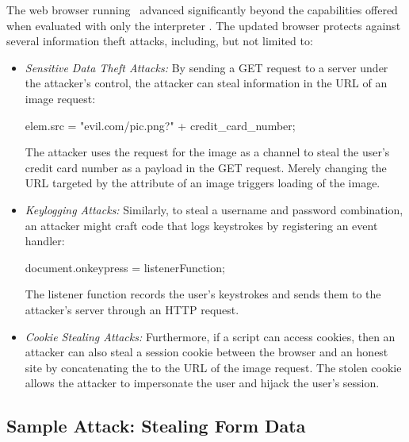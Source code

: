 The web browser running \JitFlow\ advanced significantly beyond the capabilities offered when evaluated with only the interpreter \FlowCore.
The updated browser protects against several information theft attacks, including, but not limited to:

\begin{itemize}[itemsep=4pt,parsep=4pt]

\item \textit{Sensitive Data Theft Attacks:}
By sending a GET request to a server under the attacker's control, the attacker can steal information in the URL of an image request:

\begin{snippet}
elem.src = "evil.com/pic.png?" + credit_card_number;
\end{snippet}

The attacker uses the request for the image as a channel to steal the user's credit card number as a payload in the GET request.
Merely changing the URL targeted by the  attribute of an image triggers loading of the image.

\item \textit{Keylogging Attacks:}
Similarly, to steal a username and password combination, an attacker might craft code that logs keystrokes by registering an event handler:

\begin{snippet}
document.onkeypress = listenerFunction;
\end{snippet}

The listener function records the user's keystrokes and sends them to the attacker's server through an HTTP request.

\item \textit{Cookie Stealing Attacks:}
Furthermore, if a script can access cookies, then an attacker can also steal a session cookie between the browser and an honest site by concatenating the  to the URL of the image request.
The stolen cookie allows the attacker to impersonate the user and hijack the user's session.

\end{itemize}

\subsection{Sample Attack: Stealing Form Data}
\label{sec:jitflow-stealingformdata}

